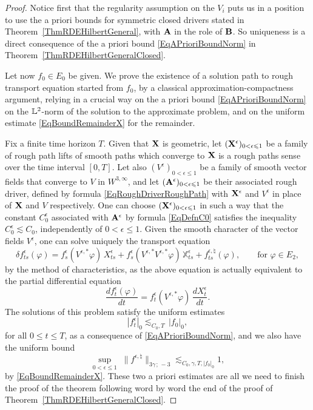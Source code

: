 \documentclass[11pt,a4paper]{amsart}
\newcommand{\bbX}{\mathbb{X}}
\renewcommand{\leq}{\leqslant}
\theoremstyle{plain}%
\theoremstyle{definition}
\theoremstyle{remark}
\numberwithin{equation}{section} %
\begin{document}
\begin{proof}
Notice first that the regularity assumption on the $V_i$ puts us in a position to use the a priori bounds for symmetric closed drivers stated in Theorem~\ref{ThmRDEHilbertGeneral}, with $\bf A$ in the role of $\bf B$. So uniqueness is a direct consequence of the a priori bound \eqref{EqAPrioriBoundNorm} in Theorem~\ref{ThmRDEHilbertGeneralClosed}.

\smallskip

Let now $f_0\in E_0$ be given. We prove the existence of a solution path to rough transport equation started from $f_0$, by a classical approximation-compactness argument, relying in a crucial way on the a priori bound \eqref{EqAPrioriBoundNorm} on the $\mathbb{L}^2$-norm of the solution to the approximate problem, and on the uniform estimate \eqref{EqBoundRemainderX} for the remainder. 

\smallskip

Fix a finite time horizon $T$.
Given that ${\bf X}$ is geometric, let $({\bfX}^\epsilon)_{0<\epsilon\leq 1}$ be a family of rough path lifts of smooth paths which converge to ${\bf X}$ is a rough paths sense over the time interval $[0,T]$. Let also $(V^\epsilon)_{0<\epsilon\leq 1}$ be a family of smooth vector fields that converge to $V$ in $W^{3,\infty}$, and let $({\bf A}^\epsilon)_{0<\epsilon\leq 1}$ be their associated rough driver, defined by formula \eqref{EqRoughDriverRoughPath} with ${{\bf X}}^\epsilon$ and $V^\epsilon$ in place of ${\bf X}$ and $V$ respectively. One can choose $({\bfX}^\epsilon)_{0<\epsilon\leq 1}$ in such a way that the constant $C_0^\epsilon$ associated with ${\bf A}^\epsilon$ by formula \eqref{EqDefnC0} satisfies the inequality $C_0^\epsilon\lesssim C_0$, independently of $0<\epsilon\leq 1$. Given the smooth character of the vector fields $V^\epsilon$, one can solve uniquely the transport equation
\begin{equation*}
\delta f^\epsilon_{ts}(\varphi) = f^\epsilon_s(V^{\epsilon,\ast} \varphi)\,X^\epsilon_{ts} + f^\epsilon_s(V^{\epsilon,\ast}V^{\epsilon,\ast}\varphi)\,\bbX^\epsilon_{ts} + f^{\epsilon, \natural}_{ts}(\varphi), \quad\quad \textrm{for } \varphi\in E_2,
\end{equation*}
by the method of characteristics, as the above equation is actually equivalent to the partial differential equation
$$ 
\frac{df^\epsilon_t(\varphi)}{dt} = f^\epsilon_t(V^{\epsilon,\ast}\varphi)\,\frac{dX^\epsilon_t}{dt}.
$$
The solutions of this problem satisfy the uniform estimates
\begin{equation*}
| f^\epsilon_t |_0 \lesssim_{C_0,T}\,| f_0 |_0,
\end{equation*}
for all $0\leq t\leq T$, as a consequence of \eqref{EqAPrioriBoundNorm}, and we also have the uniform bound
\begin{equation*}
\sup_{0<\epsilon\leq 1}\;\| f^{\epsilon, \natural} \|_{3 \gamma\,;\, - 3} \lesssim_{C_0, \gamma, T,|f_0|_0} 1,
\end{equation*}
by \eqref{EqBoundRemainderX}. These two a priori estimates are all we need to finish the proof of the theorem following word by word the end of the proof of Theorem~\ref{ThmRDEHilbertGeneralClosed}. 
\end{proof}
\end{document}
